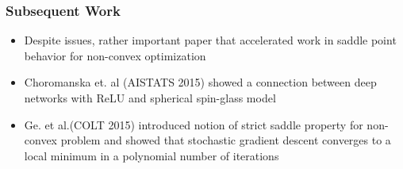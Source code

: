 \documentclass{beamer}
\begin{document}
\begin{frame}
\frametitle{Subsequent Work}
\begin{itemize}
\pause
\item{Despite issues, rather important paper that accelerated work in saddle point behavior for non-convex optimization}
\vspace{0.04in}
\pause
\item{Choromanska et. al (AISTATS 2015) showed a connection between deep networks with
ReLU and spherical spin-glass model}
\vspace{0.04in}
\pause
\item{Ge. et al.(COLT 2015) introduced notion of strict saddle property for non-convex problem and showed that stochastic gradient descent converges to a local minimum in a polynomial number of iterations}
\vspace{0.04in}
\end{itemize}
\end{frame}
\end{document}
